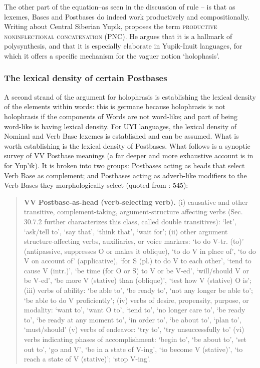 \documentclass[output=paper]{langscibook}
\begin{document}
The other part of the equation--as seen in the discussion of rule -- is that as lexemes, Bases and Postbases do indeed work productively and compositionally. Writing about Central Siberian Yupik, \citet{Reuse2009} proposes the term \textsc{productive} \textsc{noninflectional} \textsc{concatenation} (PNC). He argues that it is a hallmark of polysynthesis, and that it is especially elaborate in Yupik-Inuit languages, for which it offers a specific mechanism for the vaguer notion `holophasis'.


\subsubsection{The lexical density of certain Postbases} \label{sec:3.4.2}

A second strand of the argument for holophrasis is establishing the lexical density of the elements within words: this is germane because holophrasis is not holophrasis if the components of Words are not word-like; and part of being word-like is having lexical density. For UYI languages, the lexical density of Nominal and Verb Base lexemes is established and can be assumed. What is worth establishing is the lexical density of Postbases. What follows is a synoptic survey of VV Postbase meanings (a far deeper and more exhaustive account is in \citealt{Miyaoka2012} for Yup'ik). It is broken into two groups: Postbases acting as heads that select Verb Base as complement; and Postbases acting as adverb-like modifiers to the Verb Bases they morphologically select (quoted from \citealt{Woodbury2017}: 545):

\begin{quote}
\textbf{VV} \textbf{Postbase-as-head} \textbf{(verb-selecting} \textbf{verb).} (i) causative and other transitive, complement-taking, argument-structure affecting verbs (Sec. 30.7.2 further characterizes this class, called double transitives): `let', `ask/tell to', `say that', `think that', `wait for'; (ii) other argument structure-affecting verbs, auxiliaries, or voice markers: `to do V-tr. (to)' (antipassive, suppresses O or makes it oblique), `to do V in place of', `to do V on account of' (applicative), `for S (pl.) to do V to each other', `tend to cause V (intr.)', `be time (for O or S) to V or be V-ed', `will/should V or be V-ed', `be more V (stative) than (oblique)', `test how V (stative) O is'; (iii) verbs of ability: `be able to', `be ready to', `not any longer be able to'; `be able to do V proficiently'; (iv) verbs of desire, propensity, purpose, or modality: `want to', `want O to', `tend to', `no longer care to', `be ready to', `be ready at any moment to', `in order to', `be about to', `plan to', `must/should' (v) verbs of endeavor: `try to', `try unsuccessfully to' (vi) verbs indicating phases of accomplishment: `begin to', `be about to', `set out to', `go and V', `be in a state of V-ing', `to become V (stative)', `to reach a state of V (stative)'; `stop V-ing'.
\end{quote}
\end{document}
